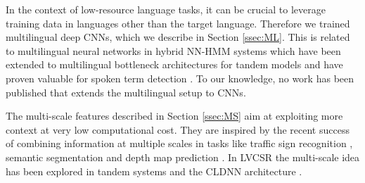\documentclass{article}
\begin{document}
In the context of low-resource language tasks, it can be crucial to leverage 
training data in languages other than the target language.
Therefore we trained multilingual deep CNNs, which we describe in Section \ref{ssec:ML}.
This is related to
multilingual neural networks in hybrid NN-HMM systems \cite{scanzio2008use}
which have been extended to multilingual bottleneck architectures for 
tandem models \cite{thomas2012multilingual, tuske2013investigation}
and have proven valuable for spoken term detection \cite{knill2013investigation}.
To our knowledge, no work has been published that extends the multilingual setup to CNNs.

The multi-scale features described in Section \ref{ssec:MS} aim at exploiting
more context at very low computational cost.
They are inspired by the recent success of combining information at multiple scales in tasks like 
traffic sign recognition \cite{sermanet2011traffic},
semantic segmentation \cite{farabet2013learning, long2014fully} and 
depth map prediction \cite{eigen2014depth}.
In LVCSR the multi-scale idea has been explored in tandem systems \cite{grezl2009investigation}
and the CLDNN architecture \cite{sainathconvolutional}.
\end{document}
